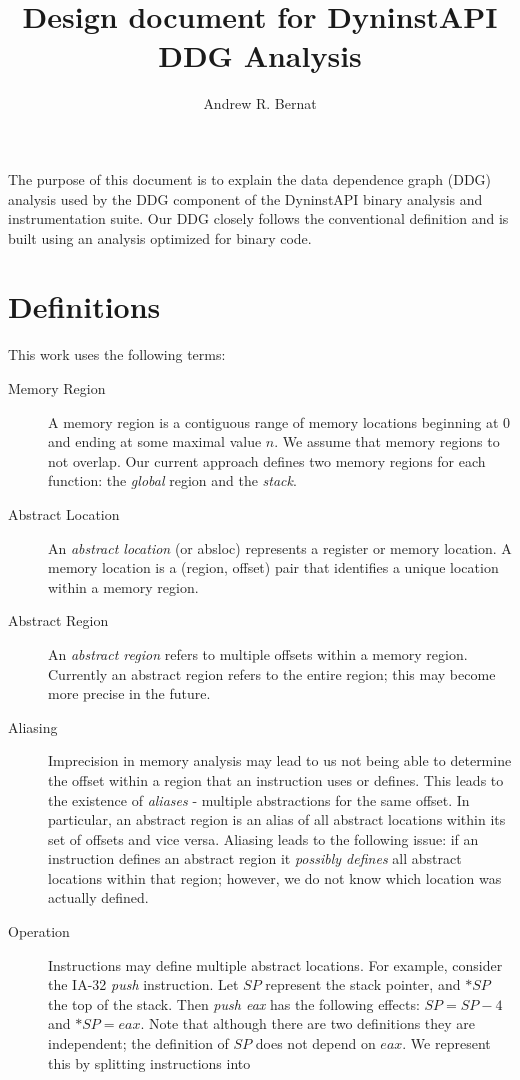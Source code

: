 \documentclass[11pt]{article}
\title{Design document for DyninstAPI DDG Analysis}
\author{Andrew R. Bernat}
\begin{document}
The purpose of this document is to explain the data dependence graph
(DDG) analysis used by the DDG component of the DyninstAPI binary
analysis and instrumentation suite. Our DDG closely follows the
conventional definition and is built using an analysis optimized for
binary code.

\section*{Definitions}

This work uses the following terms:

\begin{description}
\item[Memory Region] A memory region is a contiguous range of memory
  locations beginning at 0 and ending at some maximal value $n$. We
  assume that memory regions to not overlap. Our current approach
  defines two memory regions for each function: the \emph{global}
  region and the \emph{stack}. 
\item[Abstract Location] An \emph{abstract location} (or absloc) represents a
  register or memory location. A memory location is a (region, offset)
  pair that identifies a unique location within a memory region.
\item[Abstract Region] An \emph{abstract region} refers to multiple
  offsets within a memory region. Currently an abstract region refers
  to the entire region; this may become more precise in the future.
\item[Aliasing] Imprecision in memory analysis may lead to us not
  being able to determine the offset within a region that an
  instruction uses or defines. This leads to the existence of
  \emph{aliases} - multiple abstractions for the same offset. In
  particular, an abstract region is an alias of all abstract locations
  within its set of offsets and vice versa. Aliasing leads to the
  following issue: if an instruction defines an abstract region it
  \emph{possibly defines} all abstract locations within that region;
  however, we do not know which location was actually defined.
\item[Operation] Instructions may define multiple abstract
  locations. For example, consider the IA-32 \emph{push}
  instruction. Let $SP$ represent the stack pointer, and $*SP$ the top
  of the stack. Then \emph{push eax} has the following effects: $SP = SP -
  4$ and $*SP = eax$. Note that although there are two definitions
  they are independent; the definition of $SP$ does not depend on
  $eax$. We represent this by splitting instructions into

\end{description}
\end{document}
